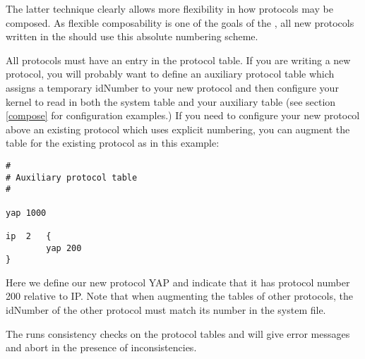 The latter technique clearly allows more flexibility in how protocols
may be composed.  As flexible composability is one of the goals of the
\xk{}, all new protocols written in the \xk{} should use this absolute
numbering scheme.

All protocols must have an entry in the protocol table.  If you are
writing a new protocol, you will probably want to define an auxiliary
protocol table which assigns a temporary idNumber to your new protocol
and then configure your kernel to read in both the system table and
your auxiliary table (see section \ref{compose} for configuration
examples.)  If you need to configure your new protocol above an
existing protocol which uses explicit numbering, you can augment the
table for the existing protocol as in this example:

\begin{verbatim}
#
# Auxiliary protocol table 
#

yap	1000

ip	2 	{
        yap	200
}
\end{verbatim}

Here we define our new protocol YAP and indicate that it has protocol
number 200 relative to IP.  Note that when augmenting the tables of
other protocols, the idNumber of the other protocol must match its
number in the system file.

The \xk{} runs consistency checks on the protocol tables and will give
error messages and abort in the presence of inconsistencies.



